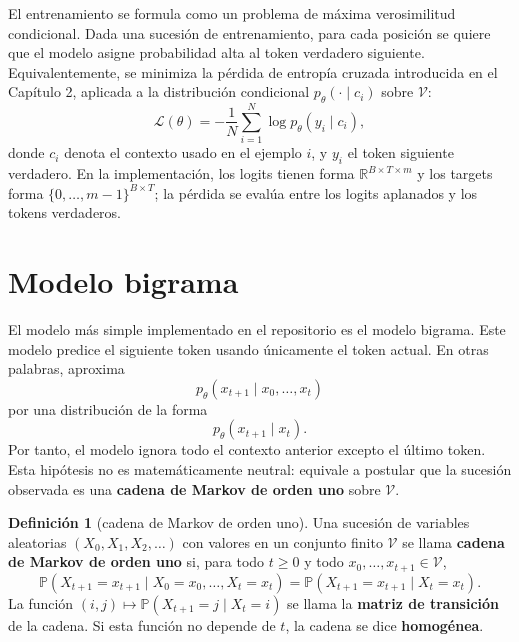 \documentclass[11pt]{report}
\newenvironment{tcolorbox}[1][]{\par\medskip\noindent\ignorespaces}{\par\medskip}
\theoremstyle{definition}
\newtheorem{definicion}{Definición}[section]
\theoremstyle{plain}
\numberwithin{equation}{section}
\newcommand{\PP}{\mathbb{P}}
\newcommand{\V}{\mathcal{V}}
\begin{document}
El entrenamiento se formula como un problema de máxima verosimilitud condicional. Dada una sucesión de entrenamiento, para cada posición se quiere que el modelo asigne probabilidad alta al token verdadero siguiente. Equivalentemente, se minimiza la pérdida de entropía cruzada introducida en el Capítulo 2, aplicada a la distribución condicional \(p_\theta(\cdot\mid c_i)\) sobre \(\mathcal{V}\):
\begin{equation*}
    \mathcal{L}(\theta)
    =
    -\frac{1}{N}
    \sum_{i=1}^{N}
    \log p_\theta(y_i\mid c_i),
\end{equation*}
donde \(c_i\) denota el contexto usado en el ejemplo \(i\), y \(y_i\) el token siguiente verdadero. En la implementación, los logits tienen forma \(\mathbb{R}^{B\times T\times m}\) y los targets forma \(\{0,\ldots,m-1\}^{B\times T}\); la pérdida se evalúa entre los logits aplanados y los tokens verdaderos.

\section{Modelo bigrama}

El modelo más simple implementado en el repositorio es el modelo bigrama. Este modelo predice el siguiente token usando únicamente el token actual. En otras palabras, aproxima
\begin{equation*}
    p_\theta(x_{t+1}\mid x_0,\ldots,x_t)
\end{equation*}
por una distribución de la forma
\begin{equation*}
    p_\theta(x_{t+1}\mid x_t).
\end{equation*}
Por tanto, el modelo ignora todo el contexto anterior excepto el último token. Esta hipótesis no es matemáticamente neutral: equivale a postular que la sucesión observada es una \textbf{cadena de Markov de orden uno} sobre \(\V\).

\begin{tcolorbox}[colback=blue!8, colframe=blue!8, boxrule=0pt]
\begin{definicion}[cadena de Markov de orden uno]
Una sucesión de variables aleatorias \((X_0,X_1,X_2,\ldots)\) con valores en un conjunto finito \(\V\) se llama \textbf{cadena de Markov de orden uno} si, para todo \(t\geq 0\) y todo \(x_0,\ldots,x_{t+1}\in\V\),
\begin{equation*}
    \PP(X_{t+1}=x_{t+1}\mid X_0=x_0,\ldots,X_t=x_t)
    =
    \PP(X_{t+1}=x_{t+1}\mid X_t=x_t).
\end{equation*}
La función \((i,j)\mapsto\PP(X_{t+1}=j\mid X_t=i)\) se llama la \textbf{matriz de transición} de la cadena. Si esta función no depende de \(t\), la cadena se dice \textbf{homogénea}.
\end{definicion}
\end{tcolorbox}
\end{document}
